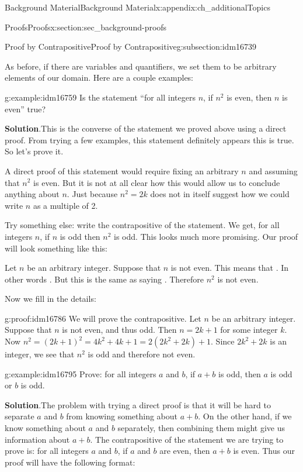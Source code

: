 \documentclass[oneside,10pt,]{book}
\numberwithin{equation}{chapter}
\begin{document}
\begin{appendixptx}{Background Material}{}{Background Material}{}{}{x:appendix:ch_additionalTopics}
\begin{sectionptx}{Proofs}{}{Proofs}{}{}{x:section:sec_background-proofs}
\begin{subsectionptx}{Proof by Contrapositive}{}{Proof by Contrapositive}{}{}{g:subsection:idm16739}
\begin{quote}
\end{quote}
As before, if there are variables and quantifiers, we set them to be arbitrary elements of our domain. Here are a couple examples:%
\begin{example}{}{g:example:idm16759}%
Is the statement ``for all integers \(n\), if \(n^2\) is even, then \(n\) is even'' true?%
\par\smallskip%
\noindent\textbf{Solution}.\hypertarget{g:solution:idm16766}{}\quad{}This is the converse of the statement we proved above using a direct proof. From trying a few examples, this statement definitely appears this is true. So let's prove it.%
\par
A direct proof of this statement would require fixing an arbitrary \(n\) and assuming that \(n^2\) is even. But it is not at all clear how this would allow us to conclude anything about \(n\). Just because \(n^2 = 2k\) does not in itself suggest how we could write \(n\) as a multiple of 2.%
\par
Try something else: write the contrapositive of the statement. We get, for all integers \(n\), if \(n\) is odd then \(n^2\) is odd. This looks much more promising. Our proof will look something like this:%
\par
Let \(n\) be an arbitrary integer. Suppose that \(n\) is not even. This means that \textellipsis{}. In other words \textellipsis{}. But this is the same as saying \textellipsis{}. Therefore \(n^2\) is not even.%
\par
Now we fill in the details:%
\begin{proofptx}{}{g:proof:idm16786}
We will prove the contrapositive. Let \(n\) be an arbitrary integer. Suppose that \(n\) is not even, and thus odd. Then \(n= 2k+1\) for some integer \(k\). Now \(n^2 = (2k+1)^2 = 4k^2 + 4k + 1 = 2(2k^2 + 2k) + 1\). Since \(2k^2 + 2k\) is an integer, we see that \(n^2\) is odd and therefore not even.%
\end{proofptx}
\end{example}
\begin{example}{}{g:example:idm16795}%
Prove: for all integers \(a\) and \(b\), if \(a + b\) is odd, then \(a\) is odd or \(b\) is odd.%
\par\smallskip%
\noindent\textbf{Solution}.\hypertarget{g:solution:idm16803}{}\quad{}The problem with trying a direct proof is that it will be hard to separate \(a\) and \(b\) from knowing something about \(a+b\). On the other hand, if we know something about \(a\) and \(b\) separately, then combining them might give us information about \(a+b\). The contrapositive of the statement we are trying to prove is: for all integers \(a\) and \(b\), if \(a\) and \(b\) are even, then \(a+b\) is even. Thus our proof will have the following format:%

\end{example}
\end{subsectionptx}
\end{sectionptx}
\end{appendixptx}
\end{document}
